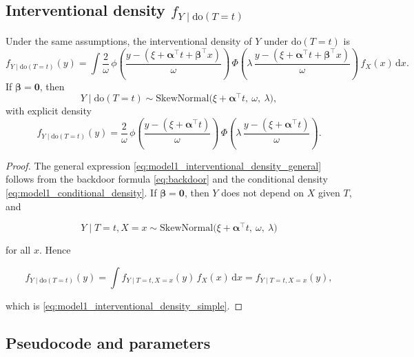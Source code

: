 \documentclass[11pt]{article}
\begin{document}
\subsection{Interventional density $f_{Y \mid \mathrm{do}(T=t)}$}

\begin{theorem}
Under the same assumptions, the interventional density of $Y$ under $\mathrm{do}(T=t)$ is
\begin{equation}
    f_{Y \mid \mathrm{do}(T=t)}(y)
    = \int \frac{2}{\omega}\,
      \phi\!\left(\frac{y - (\xi + \bm{\alpha}^\top t + \bm{\beta}^\top x)}{\omega}\right)\,
      \Phi\!\left(\lambda\, \frac{y - (\xi + \bm{\alpha}^\top t + \bm{\beta}^\top x)}{\omega}\right)\,
      f_X(x)\, \mathrm{d}x.
    \label{eq:model1_interventional_density_general}
\end{equation}
If $\bm{\beta} = \bm{0}$, then
\begin{equation}
    Y \mid \mathrm{do}(T=t) \sim \mathrm{SkewNormal}\big(\xi + \bm{\alpha}^\top t,\ \omega,\ \lambda\big),
    \label{eq:model1_interventional_law_simple}
\end{equation}
with explicit density
\begin{equation}
    f_{Y \mid \mathrm{do}(T=t)}(y)
    = \frac{2}{\omega}\,
      \phi\!\left(\frac{y - (\xi + \bm{\alpha}^\top t)}{\omega}\right)\,
      \Phi\!\left(\lambda\, \frac{y - (\xi + \bm{\alpha}^\top t)}{\omega}\right).
    \label{eq:model1_interventional_density_simple}
\end{equation}
\end{theorem}

\begin{proof}
The general expression \eqref{eq:model1_interventional_density_general} follows from the backdoor formula \eqref{eq:backdoor} and the conditional density \eqref{eq:model1_conditional_density}.
If $\bm{\beta} = \bm{0}$, then $Y$ does not depend on $X$ given $T$, and


\[
Y \mid T=t,X=x \sim \mathrm{SkewNormal}\big(\xi + \bm{\alpha}^\top t,\ \omega,\ \lambda\big)
\]


for all $x$.
Hence


\[
f_{Y \mid \mathrm{do}(T=t)}(y)
= \int f_{Y \mid T=t,X=x}(y)\, f_X(x)\, \mathrm{d}x
= f_{Y \mid T=t,X=x}(y),
\]


which is \eqref{eq:model1_interventional_density_simple}.
\end{proof}

\subsection{Pseudocode and parameters}
\end{document}
